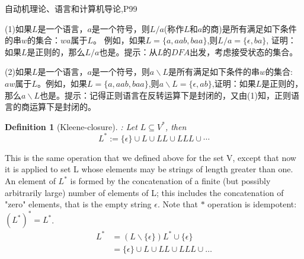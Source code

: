 \documentclass[graybox,envcountchap,sectrefs]{svmono1}
\newtheorem{myDf}{Definition}
\begin{document}
\clearpage

自动机理论、语言和计算机导论,P99

(1)如果$L$是一个语言，$a$是一个符号，则$L/a$(称作$L$和$a$的商)是所有满足如下条件的串$w$的集合：$wa$属于$L$。
例如，如果$L=\{a,aab,baa\}$,则$L/a = \{\epsilon,ba\}$, 证明：如果$L$是正则的，那么$L/a$也是。提示：从$L$的$DFA$出发，考虑接受状态的集合。

(2)如果$L$是一个语言，$a$是一个符号，则$a\backslash L$是所有满足如下条件的串$w$的集合: $aw$属于$L$。例如，如果$L=\{a,aab,baa\}$,则$a\backslash L=\{\epsilon,ab\}$,证明：如果$L$是正则的，那么$a\backslash L$也是。提示：记得正则语言在反转运算下是封闭的，又由(1)知，正则语言的商运算下是封闭的。

\begin{myDf}[Kleene-closure]: 
	Let $L\subseteq V^{\ast}$, then 
	$$L^{\ast} := \{\epsilon\}\cup L \cup LL\cup LLL\cup \cdots$$ 
\end{myDf}

This is the same operation that we defined above for the set V, except that now it is applied to set L whose elements may be strings of length greater than one. An element of $L^*$ is formed by the concatenation of a finite (but possibly arbitrarily large) number of elements of L; this includes the concatenation of "zero" elements, that is the empty string $\epsilon$. Note that $\ast$ operation is idempotent: ${(L^*)}^* = L^*$.
\begin{align*}
L^{\ast} & = (L\backslash \{\epsilon\})L^{\ast}\cup \{\epsilon\} \\
         & = \{\epsilon \} \cup L\cup LL\cup LLL\cup \dots
\end{align*}
\end{document}
